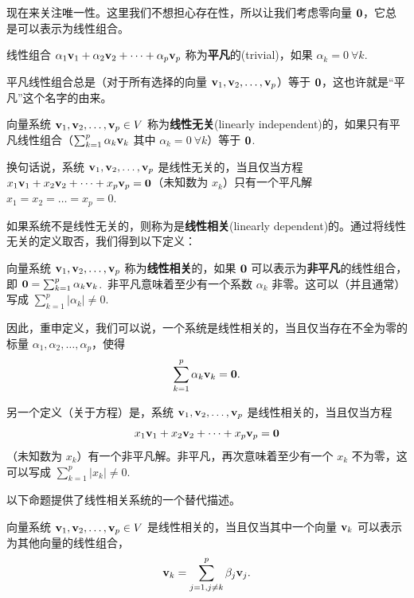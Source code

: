 现在来关注唯一性。这里我们不想担心存在性，所以让我们考虑零向量 $\mathbf{0}$，它总是可以表示为线性组合。

\begin{definition*}
线性组合 $\alpha_1 \mathbf{v}_1 + \alpha_2 \mathbf{v}_2 + \dots + \alpha_p \mathbf{v}_p$ 称为\textbf{平凡}的(trivial)，如果 $\alpha_k = 0 \ \forall k$.~
\end{definition*}

平凡线性组合总是（对于所有选择的向量 $\mathbf{v}_1, \mathbf{v}_2, \dots, \mathbf{v}_p$）等于 $\mathbf{0}$，这也许就是“平凡”这个名字的由来。


\begin{definition*}
向量系统 $\mathbf{v}_1, \mathbf{v}_2, \dots, \mathbf{v}_p \in V$ 称为\textbf{线性无关}(linearly independent)的，如果只有平凡线性组合（$\sum_{k=1}^p \alpha_k \mathbf{v}_k$ 其中 $\alpha_k = 0 \ \forall k$）等于 $\mathbf{0}$.~
\end{definition*}

换句话说，系统 $\mathbf{v}_1, \mathbf{v}_2, \dots, \mathbf{v}_p$ 是线性无关的，当且仅当方程 $x_1 \mathbf{v}_1 + x_2 \mathbf{v}_2 + \dots + x_p \mathbf{v}_p = \mathbf{0}$（未知数为 $x_k$）只有一个平凡解 $x_1 = x_2 = \dots = x_p = 0$.~


如果系统不是线性无关的，则称为是\textbf{线性相关}(linearly dependent)的。通过将线性无关的定义取否，我们得到以下定义：



\begin{definition*}
向量系统 $\mathbf{v}_1, \mathbf{v}_2, \dots, \mathbf{v}_p$ 称为\textbf{线性相关}的，如果 $\mathbf{0}$ 可以表示为\textbf{非平凡}的线性组合，即 $\mathbf{0} = \sum_{k=1}^p \alpha_k \mathbf{v}_k$.~非平凡意味着至少有一个系数 $\alpha_k$ 非零。这可以（并且通常）写成 $\sum_{k=1}^p |\alpha_k| \neq 0$.~
\end{definition*}


因此，重申定义，我们可以说，一个系统是线性相关的，当且仅当存在不全为零的标量 $\alpha_1, \alpha_2, \dots, \alpha_p$，使得
$$\sum_{k=1}^p \alpha_k \mathbf{v}_k = \mathbf{0}.$$

另一个定义（关于方程）是，系统 $\mathbf{v}_1, \mathbf{v}_2, \dots, \mathbf{v}_p$ 是线性相关的，当且仅当方程
$$x_1 \mathbf{v}_1 + x_2 \mathbf{v}_2 + \dots + x_p \mathbf{v}_p = \mathbf{0}$$
（未知数为 $x_k$）有一个非平凡解。非平凡，再次意味着至少有一个 $x_k$ 不为零，这可以写成 $\sum_{k=1}^p |x_k| \neq 0$.~

以下命题提供了线性相关系统的一个替代描述。

\begin{proposition}\label{stmt:01-02-06}
向量系统 $\mathbf{v}_1, \mathbf{v}_2, \dots, \mathbf{v}_p \in V$ 是线性相关的，当且仅当其中一个向量 $\mathbf{v}_k$ 可以表示为其他向量的线性组合，
\begin{equation}\label{eq:01-02-01}
\mathbf{v}_k = \sum_{j=1, j \neq k}^p \beta_j \mathbf{v}_j.
\end{equation}
\end{proposition}


